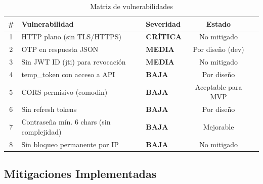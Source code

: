 \documentclass[12pt,a4paper,openany]{article}
\begin{document}
\begin{table}[H]
\centering
\caption{Matriz de vulnerabilidades}
\begin{tabular}{@{}cllcl@{}}
\toprule
\# & \textbf{Vulnerabilidad} & \textbf{Severidad} & \textbf{Estado} \\
\midrule
1 & HTTP plano (sin TLS/HTTPS) & \textcolor{danger}{\textbf{CRÍTICA}} & No mitigado \\
2 & OTP en respuesta JSON & \textcolor{warning}{\textbf{MEDIA}} & Por diseño (dev) \\
3 & Sin JWT ID (jti) para revocación & \textcolor{warning}{\textbf{MEDIA}} & No mitigado \\
4 & temp\_token con acceso a API & \textcolor{accent}{\textbf{BAJA}} & Por diseño \\
5 & CORS permisivo (comodin) & \textcolor{accent}{\textbf{BAJA}} & Aceptable para MVP \\
6 & Sin refresh tokens & \textcolor{accent}{\textbf{BAJA}} & Por diseño \\
7 & Contraseña mín. 6 chars (sin complejidad) & \textcolor{accent}{\textbf{BAJA}} & Mejorable \\
8 & Sin bloqueo permanente por IP & \textcolor{accent}{\textbf{BAJA}} & No mitigado \\
\bottomrule
\end{tabular}
\end{table}

\subsection{Mitigaciones Implementadas}
\end{document}
